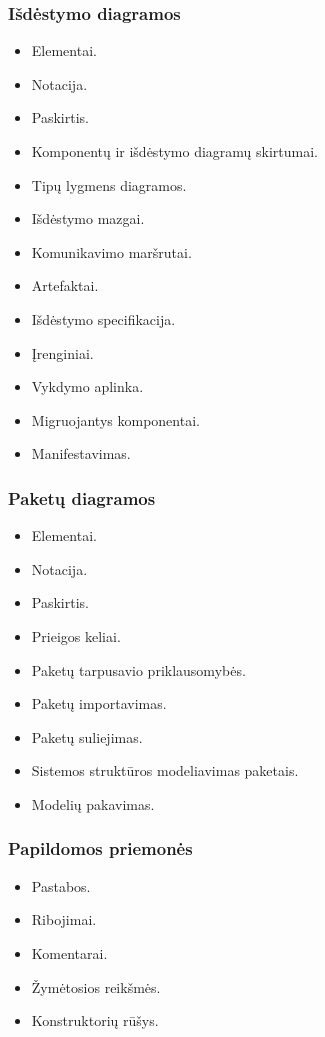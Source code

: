 \subsubsection{Išdėstymo diagramos}

\begin{itemize}
  \item Elementai.
  \item Notacija.
  \item Paskirtis.
  \item Komponentų ir išdėstymo diagramų skirtumai.
  \item Tipų lygmens diagramos.
  \item Išdėstymo mazgai.
  \item Komunikavimo maršrutai.
  \item Artefaktai.
  \item Išdėstymo specifikacija.
  \item Įrenginiai.
  \item Vykdymo aplinka.
  \item Migruojantys komponentai.
  \item Manifestavimas.
\end{itemize}

\subsubsection{Paketų diagramos}

\begin{itemize}
  \item Elementai.
  \item Notacija.
  \item Paskirtis.
  \item Prieigos keliai.
  \item Paketų tarpusavio priklausomybės.
  \item Paketų importavimas.
  \item Paketų suliejimas.
  \item Sistemos struktūros modeliavimas paketais.
  \item Modelių pakavimas.
\end{itemize}

\subsubsection{Papildomos priemonės}

\begin{itemize}
  \item Pastabos.
  \item Ribojimai.
  \item Komentarai.
  \item Žymėtosios reikšmės.
  \item Konstruktorių rūšys.
\end{itemize}
